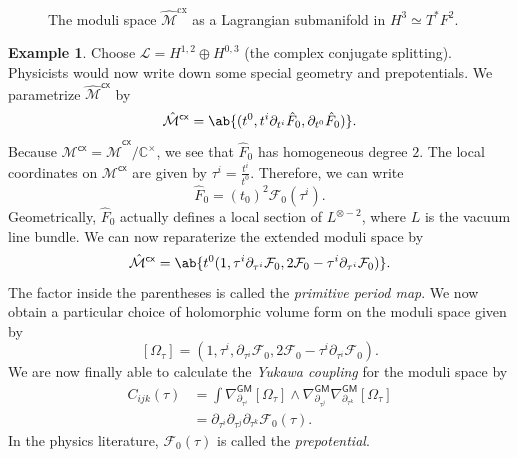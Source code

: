 \documentclass{amsart}
\theoremstyle{definition}
\newtheorem{exm}[thm]{Example}
\theoremstyle{remark}
\theoremstyle{plain}
\theoremstyle{definition}
\theoremstyle{remark}
\newcommand{\C}{\mathbb{C}}
\newcommand{\mc}[1]{\mathcal{#1}}
\newcommand{\ms}[1]{\mathsf{#1}}
\newcommand{\1}{\mathbf{1}}
\newcommand{\2}{\mathbf{2}}
\newcommand{\3}{\mathbf{3}}
\begin{document}
\begin{figure}[htpb]
\begin{center}
\end{center}
\caption{The moduli space \(\hat{\mathcal M}^{\mathrm{cx}}\) as a Lagrangian submanifold in \(H^3 \simeq T^* F^2\).}%
\label{fig:lagrangian_submanifold}
\end{figure}

\begin{exm}
    Choose \(\mc{L} = H^{1,2} \oplus H^{0,3}\) (the complex conjugate splitting). Physicists would now write down some special geometry and prepotentials. We parametrize \(\hat{\mc{M}}^{\ms{cx}}\) by
    \[ \hat{\mc{M}}^{\ms{cx}} = \ab\{ (t^0, t^i \partial_{t^i} \hat{F}_0, \partial_{t^0} \hat{F}_0) \}. \]
    Because \(\mc{M}^{\ms{cx}} = \hat{\mc{M}}^{\ms{cx}} / \C^{\times}\), we see that \(\hat{F}_0\) has homogeneous degree \(2\). The local coordinates on \(\mc{M}^{\ms{cx}}\) are given by \(\tau^i = \frac{t^i}{t^0}\). Therefore, we can write
    \[ \hat{F}_0 = (t_0)^2 \mc{F}_0 (\tau^i). \]
    Geometrically, \(\hat{F}_0\) actually defines a local section of \(L^{\otimes -2}\), where \(L\) is the vacuum line bundle. We can now reparaterize the extended moduli space by
    \[ \hat{\mc{M}}^{\ms{cx}} = \ab\{ t^0 (1, \tau^i \partial_{\tau^i} \mc{F}_0, 2 \mc{F}_0 - \tau^i \partial_{\tau^i} \mc{F}_0) \}. \]
    The factor inside the parentheses is called the \textit{primitive period map}. We now obtain a particular choice of holomorphic volume form on the moduli space given by
    \[ [\Omega_{\tau}] = (1, \tau^i, \partial_{\tau^i} \mc{F}_0, 2 \mc{F}_0 - \tau^i \partial_{\tau^i} \mc{F}_0). \]
    We are now finally able to calculate the \textit{Yukawa coupling} for the moduli space by
    \begin{align*}
        C_{ijk}(\tau) &= \int \nabla^{\ms{GM}}_{\partial_{\tau^i}} [\Omega_{\tau}] \wedge \nabla^{\ms{GM}}_{\partial_{\tau^j}} \nabla^{\ms{GM}}_{\partial_{\tau^k}} [\Omega_{\tau}] \\
        &= \partial_{\tau^i} \partial_{\tau^j} \partial_{\tau^k} \mc{F}_0 (\tau).
    \end{align*}
    In the physics literature, \(\mc{F}_0(\tau)\) is called the \textit{prepotential}.
\end{exm}
\end{document}
